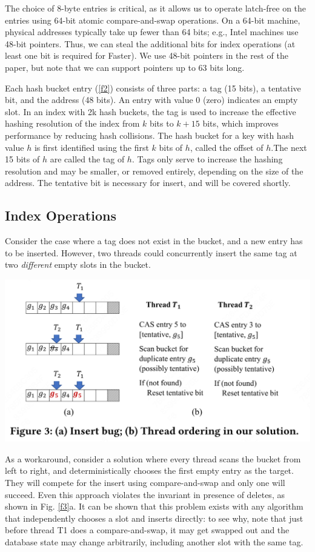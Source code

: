 \documentclass[11pt]{article}
\begin{document}
The choice of 8-byte entries is critical, as it allows us to operate latch-free on the entries using
64-bit atomic compare-and-swap operations. On a 64-bit machine, physical addresses typically take up
fewer than 64 bits; e.g., Intel machines use 48-bit pointers. Thus, we can steal the additional bits
for index operations (at least one bit is required for Faster). We use 48-bit pointers in the rest of
the paper, but note that we can support pointers up to 63 bits long.

Each hash bucket entry (\ref{f2}) consists of three parts: a tag (15 bits), a tentative bit, and the
address (48 bits). An entry with value 0 (zero) indicates an empty slot. In an index with 2k hash
buckets, the tag is used to increase the effective hashing resolution of the index from \(k\) bits to
\(k+15\) bits, which improves performance by reducing hash collisions. The hash bucket for a key with
hash value \(h\) is first identified using the first \(k\) bits of \(h\), called the offset of
\(h\).The next 15 bits of \(h\) are called the tag of \(h\). Tags only serve to increase the hashing
resolution and may be smaller, or removed entirely, depending on the size of the address. The
tentative bit is necessary for insert, and will be covered shortly.
\subsection{Index Operations}
\label{sec:orgad9ee92}
Consider the case where a tag does not exist in the bucket, and a new entry has to be inserted.
However, two threads could concurrently insert the same tag at two \emph{different} empty slots in the
bucket.

\begin{center}
\includegraphics[width=.8\textwidth]{../../images/papers/221.png}
\label{f3}
\end{center}

As a workaround, consider a solution where every thread scans the bucket from left to right, and
deterministically chooses the first empty entry as the target. They will compete for the insert using
compare-and-swap and only one will succeed. Even this approach violates the invariant in presence of
deletes, as shown in Fig. \ref{f3}a. It can be shown that this problem exists with any algorithm that
independently chooses a slot and inserts directly: to see why, note that just before thread T1 does a
compare-and-swap, it may get swapped out and the database state may change arbitrarily, including
another slot with the same tag.
\end{document}
